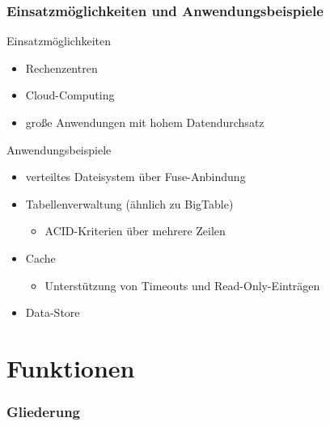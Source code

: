 \documentclass{beamer}
\begin{document}
	\begin{frame}
		\frametitle{Einsatzmöglichkeiten und Anwendungsbeispiele}

		\begin{block}{Einsatzmöglichkeiten}
			\begin{itemize}
				\item Rechenzentren
				\item Cloud-Computing
				\item große Anwendungen mit hohem Datendurchsatz
			\end{itemize}
		\end{block}

		\begin{block}{Anwendungsbeispiele}
			\begin{itemize}
				\item verteiltes Dateisystem über Fuse-Anbindung
				\item Tabellenverwaltung (ähnlich zu BigTable)
					\begin{itemize}
						\item ACID-Kriterien über mehrere Zeilen
					\end{itemize}
				\item Cache
					\begin{itemize}
						\item Unterstützung von Timeouts und Read-Only-Einträgen
					\end{itemize}
				\item Data-Store
			\end{itemize}
		\end{block}
	\end{frame}

\section{Funktionen}

	\begin{frame}
		\frametitle{Gliederung}

	\end{frame}
\end{document}
